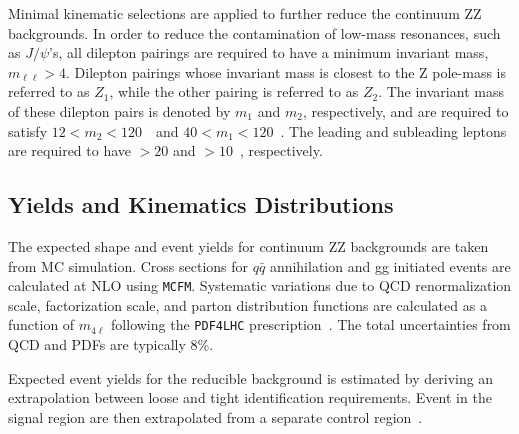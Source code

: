 
Minimal kinematic selections are applied to 
further reduce the continuum ZZ backgrounds.  In order to 
reduce the contamination of low-mass
resonances, such as $J/\psi$'s, all dilepton pairings are 
required to have a 
minimum invariant mass, $m_{\ell\ell}>4$\GeV.  Dilepton 
pairings whose invariant mass is closest to the Z pole-mass
is referred to as $Z_{1}$, while the other pairing is referred
to as $Z_{2}$.  The invariant mass of these dilepton pairs is 
denoted by $m_1$ and $m_2$, respectively, and are required
to satisfy $12<m_2<120$~\GeV~and $40<m_1<120$~\GeV.  The 
leading and subleading leptons are required to have
\pt$>20$ and \pt$>10$~\GeV, respectively.

\subsection{Yields and Kinematics Distributions}
\label{sec:HZZ4lyields}

The expected shape and event yields for continuum ZZ backgrounds
are taken from MC simulation.  Cross sections
for $q\bar{q}$ annihilation and gg initiated events are 
calculated at NLO using \verb+MCFM+.  Systematic variations due to 
QCD renormalization scale, factorization scale, and parton 
distribution functions are calculated as a function of $m_{4\ell}$
following the \verb+PDF4LHC+ prescription~\cite{Botje:2011sn,Alekhin:2011sk}. 
The total uncertainties from QCD and PDFs are typically 8\%.  

Expected event yields for the reducible background is estimated
by deriving an extrapolation between loose and tight identification
requirements.  Event in the signal region are then extrapolated
from a separate control region~\cite{CMS:xwa}.  

